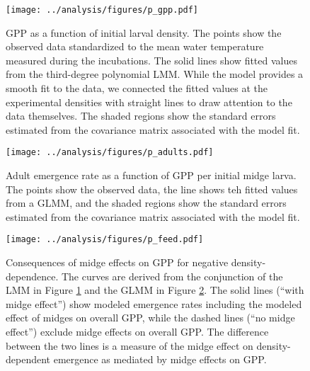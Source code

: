 \documentclass[12pt]{article}
\begin{document}
\begin{figure}
\centering
\texttt{[image: ../analysis/figures/p\_gpp.pdf]}
\caption{\label{fig:gpp}
GPP as a function of initial larval density.
The points show the observed data standardized to the mean water temperature
measured during the incubations.
The solid lines show fitted values from the third-degree polynomial LMM.
While the model provides a smooth fit to the data,
we connected the fitted values at the experimental densities with
straight lines to draw attention to the data themselves. 
The shaded regions show the standard errors estimated from the 
covariance matrix associated with the model fit.
}
\end{figure}

\clearpage




\begin{figure}
\centering
\texttt{[image: ../analysis/figures/p\_adults.pdf]}
\caption{\label{fig:adults}
Adult emergence rate as a function of GPP per initial midge larva.
The points show the observed data, 
the line shows teh fitted values from a GLMM,
and the shaded regions show the standard errors estimated from the 
covariance matrix associated with the model fit.
}
\end{figure}

\clearpage


\begin{figure}
\centering
\texttt{[image: ../analysis/figures/p\_feed.pdf]}
\caption{\label{fig:feed}
Consequences of midge effects on GPP for negative density-dependence.
The curves are derived from the conjunction of the LMM in Figure \ref{fig:gpp}
and the GLMM in Figure \ref{fig:adults}. 
The solid lines (``with midge effect'') show modeled emergence rates including the modeled
effect of midges on overall GPP,
while the dashed lines (``no midge effect'') exclude midge effects on overall GPP.
The difference between the two lines is a measure of the midge effect on density-dependent
emergence as mediated by midge effects on GPP. 
}
\end{figure}

\clearpage





\end{document}
